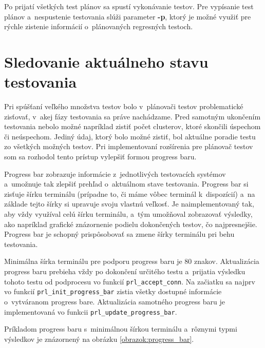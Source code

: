 Po prijatí všetkých test plánov sa spustí vykonávanie testov. 
Pre vypísanie test plánov a~nespustenie testovania slúži parameter \textbf{-p}, ktorý
je možné využiť pre rýchle zistenie informácií o~plánovaných regresných testoch.


\section{Sledovanie aktuálneho stavu testovania}
\label{sekcia:sledovanie_stavu}
Pri spúšťaní veľkého množstva testov bolo v~plánovači testov problematické
zisťovať, v~akej fázy testovania sa práve nachádzame. Pred samotným ukončením
testovania nebolo možné napríklad zistiť počet clusterov, ktoré skončili úspechom
či neúspechom. Jediný údaj, ktorý bolo možné zistiť, bol aktuálne poradie testu
zo všetkých možných testov.
Pri implementovaní rozšírenia pre plánovač testov som sa rozhodol tento
prístup vylepšiť formou progress baru.

Progress bar zobrazuje informácie z~jednotlivých testovacích systémov 
a~umožnuje tak zlepšiť prehľad o~aktuálnom stave testovania. 
Progress bar si zisťuje šírku terminálu (prípadne to, či máme vôbec terminál
k~dispozícií) a~na základe tejto šírky si upravuje svoju vlastnú veľkosť.
Je naimplementovaný tak, aby vždy využíval celú šírku terminálu, a~tým
umožňoval zobrazovať výsledky, ako napríklad grafické znázornenie podielu
dokončených testov, čo najpresnejšie. Progress bar je schopný prispôsobovať
sa zmene šírky terminálu pri behu testovania.

Minimálna šírka terminálu pre podporu progress baru je 80 znakov.
Aktualizácia progress baru prebieha vždy po dokončení určitého testu
a~prijatia výsledku tohoto testu od podprocesu vo funkcií \texttt{prl\_accept\_conn}.
Na začiatku sa najprv vo funkcií \texttt{prl\_init\_progress\_bar} zistia všetky dostupné
informácie o~vytváranom progress bare. Aktualizácia samotného progress baru je implementovaná
vo funkcii \texttt{prl\_update\_progress\_bar}.

Príkladom progress baru s~minimálnou šírkou terminálu a~rôznymi 
typmi výsledkov je znázornený na obrázku
\ref{obrazok:progress_bar}.

